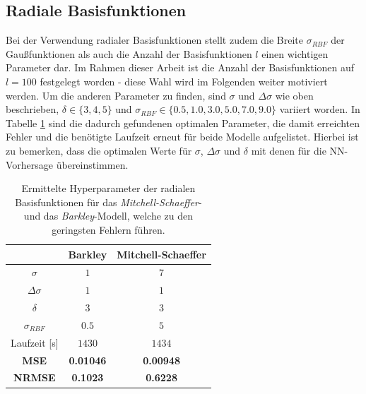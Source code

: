 \FloatBarrier
\subsection{Radiale Basisfunktionen}
Bei der Verwendung radialer Basisfunktionen stellt zudem die Breite $\sigma_{RBF}$ der Gaußfunktionen als auch die Anzahl der Basisfunktionen $l$ einen wichtigen Parameter dar. Im Rahmen dieser Arbeit ist die Anzahl der Basisfunktionen auf $l=100$ festgelegt worden - diese Wahl wird im Folgenden weiter motiviert werden. Um die anderen Parameter zu finden, sind $\sigma$ und $\Delta \sigma$ wie oben beschrieben, $\delta \in \{3,4,5\}$ und $\sigma_{RBF} \in \{0.5, 1.0, 3.0, 5.0, 7.0, 9.0\}$ variiert worden. In Tabelle \ref{tab:exp_cross_rbf_results} sind die dadurch gefundenen optimalen Parameter, die damit erreichten Fehler und die benötigte Laufzeit erneut für beide Modelle aufgelistet. Hierbei ist zu bemerken, dass die optimalen Werte für $\sigma$, $\Delta \sigma$ und $\delta$ mit denen für die NN-Vorhersage übereinstimmen. 

\begin{table}[h]
	\centering

	\begin{tabular}{ccc}
		\hline 			
		\multicolumn{1}{c}{} & Barkley & Mitchell-Schaeffer \\ 
		\hline 
		\rule[-1ex]{0pt}{2.5ex} $\sigma$ & $1$ & $7$ \\ 
		\rule[-1ex]{0pt}{2.5ex} $\Delta \sigma$ & $1$ & $1$ \\ 
		\rule[-1ex]{0pt}{2.5ex} $\delta$ & $3$ & $3$ \\ 
		\rule[-1ex]{0pt}{2.5ex} $\sigma_{RBF}$ & $0.5$ & $5$ \\ 
		\rule[-1ex]{0pt}{2.5ex} Laufzeit [s] & $1430$ & $1434$ \\ 
		\rule[-1ex]{0pt}{2.5ex} \textbf{MSE} & \textbf{0.01046} & \textbf{0.00948} \\ 
		\rule[-1ex]{0pt}{2.5ex} \textbf{NRMSE} & \textbf{0.1023} & \textbf{0.6228} \\ 
		\hline 
	\end{tabular} 
	\caption{Ermittelte Hyperparameter der radialen Basisfunktionen für das \textit{Mitchell-Schaeffer}- und das \textit{Barkley}-Modell, welche zu den geringsten Fehlern führen.}
	\label{tab:exp_cross_rbf_results}
\end{table} 

